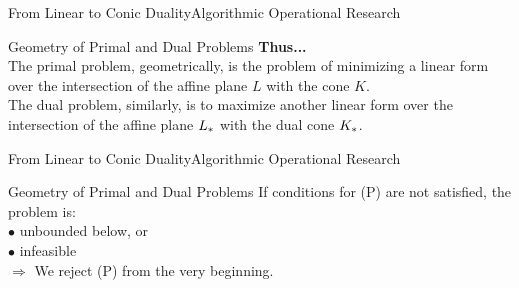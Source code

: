 \documentclass[11pt,aspectratio=169]{beamer}
\newcommand{\TT}{From Linear to Conic Duality}
\newcommand{\TL}{Algorithmic Operational Research}
\newcommand{\PII}{Geometry of Primal and Dual Problems}
\begin{document}
\begin{frame}{\TT}{\TL}
 \begin{block}{\PII}
\Large
\newline
\vspace{2mm}
    \textbf{Thus... } \newline \\
The primal problem, geometrically, is the problem of minimizing a linear form over the intersection of the affine plane $L$ with the cone $K$. \newline \\
The dual problem, similarly, is to maximize another linear form over the intersection of the affine plane $L_{\**}$ with the dual cone $K_{\**}$.
 \end{block}
\end{frame}

\begin{frame}{\TT}{\TL}
 \begin{block}{\PII}
\Large
\newline
\vspace{2mm}
   If conditions for (P) are not satisfied, the problem is: \newline \\
  \hspace{2mm} $\bullet$ unbounded below, or \\
  \hspace{2mm} $\bullet$ infeasible \\ \vspace{3mm}
  \hspace{2mm} $\Rightarrow$ We reject (P) from the very beginning. \\
 \end{block}
\end{frame}
\end{document}

